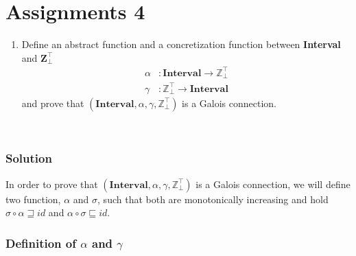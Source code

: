 \documentclass{article}
\title{}
\date{}
\author{Rafael Fernández Ortiz}
\newcommand{\interval}{\textbf{Interval}}
\newcommand{\ztop}{\mathbb{Z}_{\bot}^{\top}}
\begin{document}
\maketitle

\section*{Assignments 4}
\begin{enumerate}
\item Define an abstract function and a concretization function between \textbf{Interval} and $\mathbf{Z}_{\bot}^{\top}$
\begin{align*}
\alpha &: \interval \longrightarrow \ztop \\
\gamma &: \ztop \longrightarrow \interval
\end{align*}
and prove that $(\interval, \alpha, \gamma, \ztop)$ is a Galois connection.
\end{enumerate}\\
\subsubsection*{Solution}
In order to prove that $(\interval, \alpha, \gamma, \ztop)$ is a Galois connection, we will define two function, $\alpha$ and $\sigma$, such that both are monotonically increasing and hold $\sigma \circ  \alpha \sqsupseteq id$ and $\alpha \circ  \sigma \sqsubseteq id$.\\

\subsubsection*{Definition of $\alpha$ and $\gamma$}
\end{document}
